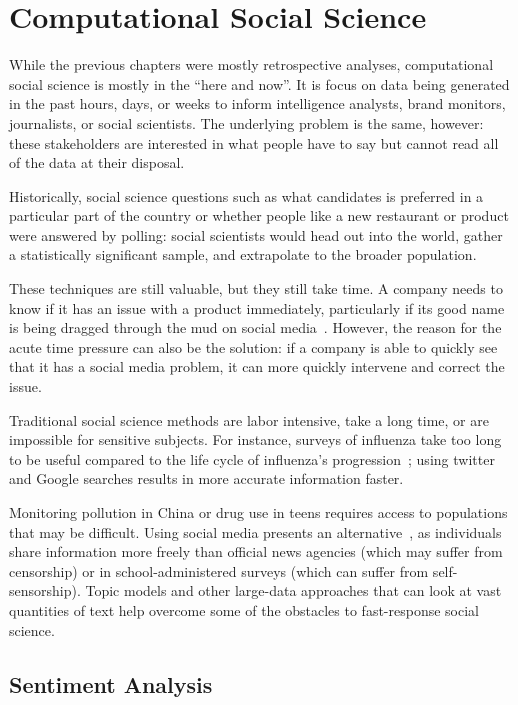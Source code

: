 
\chapter{Computational Social Science}
\label{ch:css}

While the previous chapters were mostly retrospective analyses, computational
social science is mostly in the ``here and now''.  It is focus on data
being generated in the past hours, days, or weeks to inform
intelligence analysts, brand monitors, journalists, or social
scientists.  The underlying problem is the same, however: these
stakeholders are interested in what people have to say but cannot read
all of the data at their disposal.

Historically, social science questions such as what candidates is
preferred in a particular part of the country or whether people like a
new restaurant or product were answered by polling: social scientists
would head out into the world, gather a statistically significant
sample, and extrapolate to the broader population.

These techniques are still valuable, but they still take time.  A
company needs to know if it has an issue with a product immediately,
particularly if its good name is being dragged through the mud on
social media~\cite{bowen-16}.  However, the reason for the acute time
pressure can also be the solution: if a company is able to quickly see
that it has a social media problem, it can more quickly intervene and
correct the issue.

Traditional social science methods are labor intensive, take a long
time, or are impossible for sensitive subjects.  For instance, surveys
of influenza take too long to be useful compared to the life cycle of
influenza's progression~\cite{broniatowsky-15}; using twitter and
Google searches results in more accurate information faster.

Monitoring pollution in China or drug use in teens requires access to
populations that may be difficult.  Using social media presents an
alternative~\cite{wang:paul:dredze-15}, as individuals share
information more freely than official news agencies (which may suffer
from censorship) or in school-administered surveys (which can suffer
from self-sensorship).  Topic models and other large-data approaches
that can look at vast quantities of text help overcome some of the
obstacles to fast-response social science.

\section{Sentiment Analysis}

